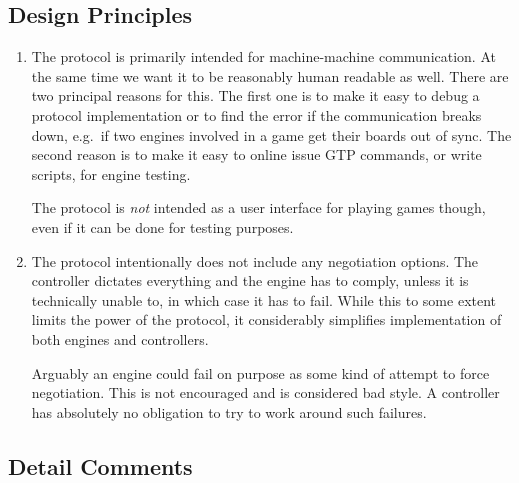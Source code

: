 \documentclass[a4paper]{article}
\begin{document}
\subsection{Design Principles}
\begin{enumerate}
\item \label{it:design-machine} The protocol is primarily intended for
  machine-machine communication. At the same time we want it to be
  reasonably human readable as well. There are two principal reasons
  for this. The first one is to make it easy to debug a protocol
  implementation or to find the error if the communication breaks
  down, e.g.\ if two engines involved in a game get their boards out
  of sync. The second reason is to make it easy to online issue GTP
  commands, or write scripts, for engine testing.

  The protocol is \emph{not} intended as a user interface for playing
  games though, even if it can be done for testing purposes.

\item The protocol intentionally does not include any negotiation
  options. The controller dictates everything and the engine has to
  comply, unless it is technically unable to, in which case it has to
  fail. While this to some extent limits the power of the protocol, it
  considerably simplifies implementation of both engines and
  controllers.

  Arguably an engine could fail on purpose as some kind of attempt to
  force negotiation. This is not encouraged and is considered bad
  style. A controller has absolutely no obligation to try to work
  around such failures.
\end{enumerate}

\subsection{Detail Comments}
\end{document}
